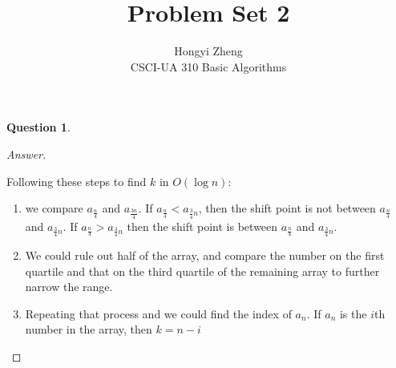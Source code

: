 \documentclass{article}
\title{Problem Set 2}
\author{%
    Hongyi Zheng
\\  CSCI-UA 310 Basic Algorithms
}
\theoremstyle{plain}
\newtheorem{question}{Question}
\newenvironment{answer}[1][Answer]
    {\begin{proof}[#1]{$ $}\renewcommand\qedsymbol{$\vartriangle$}}
    {\end{proof}}
\begin{document}
\maketitle


\begin{question}
\end{question}
\begin{answer}
    \begin{enumerate}
        Following these steps to find $k$ in $O(\log n)$:
        \begin{enumerate}
            \item  we compare $a_{\frac{n}{4}}$ and $a_{\frac{3n}{4}}$. If $a_{\frac{n}{4}} < a_{\frac{3}{4}n}$, then the shift point is not between $a_{\frac{n}{4}}$ and $a_{\frac{3}{4}n}$. If $a_{\frac{n}{4}} > a_{\frac{3}{4}n}$
            then the shift point is between $a_{\frac{n}{4}}$ and $a_{\frac{3}{4}n}$.
            \item We could rule out half of the array, and compare the number on the first quartile and that on the third quartile of the remaining array to further narrow the range.
            \item Repeating that process and we could find the index of $a_n$. If $a_n$ is the $i$th number in the array, then $k=n-i$
        \end{enumerate}
    \end{enumerate}
\end{answer}
\end{document}
